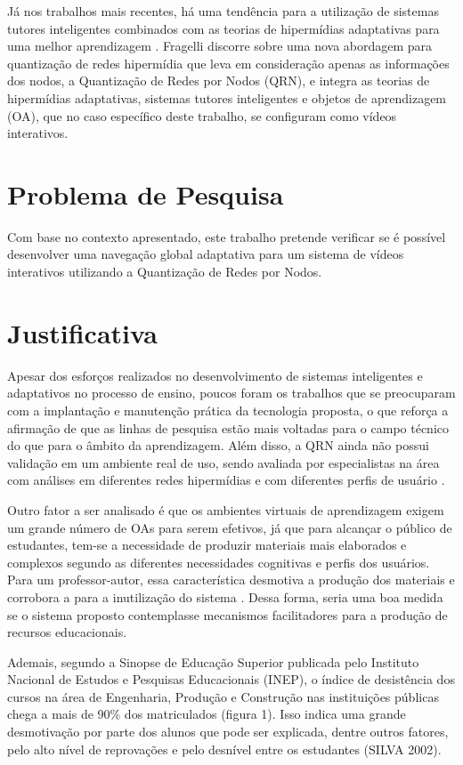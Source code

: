 Já nos trabalhos mais recentes, há uma tendência para a utilização de sistemas tutores inteligentes combinados com as teorias de hipermídias adaptativas para uma melhor aprendizagem \cite{fragelli2010}. Fragelli discorre sobre uma nova abordagem para quantização de redes hipermídia que leva em consideração apenas as informações dos nodos, a Quantização de Redes por Nodos (QRN), e integra as teorias de hipermídias adaptativas, sistemas tutores inteligentes e objetos de aprendizagem (OA), que no caso específico deste trabalho, se configuram como vídeos interativos.

\section[Problema de Pesquisa]{Problema de Pesquisa}

Com base no contexto apresentado, este trabalho pretende verificar se é possível desenvolver uma navegação global adaptativa para um sistema de vídeos interativos utilizando a Quantização de Redes por Nodos. 

\section[Justificativa]{Justificativa}

Apesar dos esforços realizados no desenvolvimento de sistemas inteligentes e adaptativos no processo de ensino, poucos foram os trabalhos que se preocuparam com a implantação e manutenção prática da tecnologia proposta, o que reforça a afirmação de que as linhas de pesquisa estão mais voltadas para o campo técnico do que para o âmbito da aprendizagem. Além disso, a QRN ainda não possui validação em um ambiente real de uso, sendo avaliada por especialistas na área com análises em diferentes redes hipermídias e com diferentes perfis de usuário \cite{fragelli2010}.

Outro fator a ser analisado é que os ambientes virtuais de aprendizagem exigem um grande número de OAs para serem efetivos, já que para alcançar o público de estudantes, tem-se a necessidade de produzir materiais mais elaborados e complexos segundo as diferentes necessidades cognitivas e perfis dos usuários. Para um professor-autor, essa característica desmotiva a produção dos materiais e corrobora a para a inutilização do sistema \cite{fragelli2010}. Dessa forma, seria uma boa medida se o sistema proposto contemplasse mecanismos facilitadores para a produção de recursos educacionais.

Ademais, segundo a Sinopse de Educação Superior publicada pelo Instituto Nacional de Estudos e Pesquisas Educacionais (INEP), o índice de desistência dos cursos na área de Engenharia, Produção e Construção nas instituições públicas chega a mais de 90\% dos matriculados (figura 1). Isso indica uma grande desmotivação por parte dos alunos que pode ser explicada, dentre outros fatores, pelo alto nível de reprovações e pelo desnível entre os estudantes (SILVA 2002).
 \cite{ausubel2000}